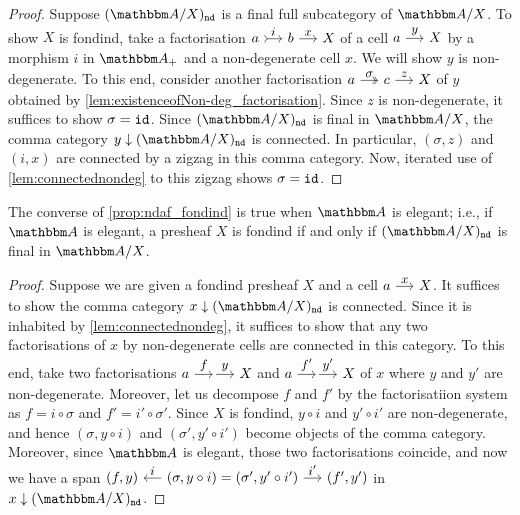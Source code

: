 \documentclass[a4paper,dvipsnames, 11pt]{amsart} %
\begin{document}
\begin{proof}
	Suppose $\ndcat{X}$ is a final full subcategory of $\dgm{A}/X$.
	To show $X$ is fondind, take a factorisation $a\arr"i"[tail]b\arr"x"X$ of a cell $a\arr"y"X$ by a morphism $i$ in $\dgm{A}_+$
	and a non-degenerate cell $x$.
	We will show $y$ is non-degenerate.
	To this end, consider another factorisation $a\arr"\sigma"[two heads]c\arr"z"X$ of $y$ obtained by \cref{lem:existenceofNon-deg_factorisation}.
	Since $z$ is non-degenerate, it suffices to show $\sigma=\mathtt{id}$.
	Since $\ndcat{X}$ is final in $\dgm{A}/X$, the comma category $y\downarrow \ndcat{X}$ is connected.
	In particular, $(\sigma,z)$ and $(i,x)$ are connected by a zigzag in this comma category.
	Now, iterated use of \cref{lem:connectednondeg} to this zigzag shows $\sigma=\mathtt{id}$.
\end{proof}
\begin{proposition}
	The converse of \cref{prop:ndaf_fondind} is true when $\dgm{A}$ is elegant; i.e.,
	if $\dgm{A}$ is elegant,
	a presheaf $X$ is fondind if and only if $\ndcat{X}$ is final in $\dgm{A}/X$.
\end{proposition}
\begin{proof}
	Suppose we are given a fondind presheaf $X$ and a cell $a\arr"x"X$.
	It suffices to show the comma category $x\downarrow\ndcat{X}$ is connected. Since it is inhabited by \cref{lem:connectednondeg}, it suffices to show that
	any two factorisations of $x$ by non-degenerate cells are connected in this category.
	To this end, take two factorisations $a\arr"f"\arr"y"X$ and $a\arr"f'"\arr"y'"X$ of $x$
	where $y$ and $y'$ are non-degenerate. Moreover, let us decompose $f$ and $f'$ by the factorisatiion system
	as $f=i\circ\sigma$ and $f'=i'\circ\sigma'$.
	Since $X$ is fondind, $y\circ i$ and $y'\circ i'$ are non-degenerate, and hence $(\sigma,y\circ i)$ and $(\sigma',y'\circ i')$ become objects of the comma category.
	Moreover, since $\dgm{A}$ is elegant, those two factorisations coincide,
	and now we have a span $(f,y)\arr"i"[leftarrow](\sigma,y\circ i)=(\sigma',y'\circ i')\arr"i'"(f',y')$ in $x\downarrow\ndcat{X}$.
\end{proof}

\printbibliography
\end{document}

